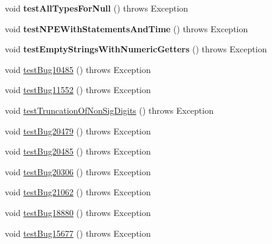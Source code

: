 \begin{DoxyCompactItemize}
void {\bfseries test\+All\+Types\+For\+Null} ()  throws Exception 
\item 
\mbox{\label{classtestsuite_1_1regression_1_1_result_set_regression_test_a9704114e8c4af7e53ecb784c74630535}} 
void {\bfseries test\+N\+P\+E\+With\+Statements\+And\+Time} ()  throws Exception 
\item 
\mbox{\label{classtestsuite_1_1regression_1_1_result_set_regression_test_aa09d2e6b4a7cfb44ec027cacfd75c65e}} 
void {\bfseries test\+Empty\+Strings\+With\+Numeric\+Getters} ()  throws Exception 
\item 
void \mbox{\hyperlink{classtestsuite_1_1regression_1_1_result_set_regression_test_a636970914398d594bf3bb15b35d2388e}{test\+Bug10485}} ()  throws Exception 
\item 
void \mbox{\hyperlink{classtestsuite_1_1regression_1_1_result_set_regression_test_a51f2936ac4b4712e95e6a70490704482}{test\+Bug11552}} ()  throws Exception 
\item 
void \mbox{\hyperlink{classtestsuite_1_1regression_1_1_result_set_regression_test_ab795cff973063bdb983542cffb1c54cd}{test\+Truncation\+Of\+Non\+Sig\+Digits}} ()  throws Exception 
\item 
void \mbox{\hyperlink{classtestsuite_1_1regression_1_1_result_set_regression_test_ac51afa90e507daec20c3fe37a132b0de}{test\+Bug20479}} ()  throws Exception 
\item 
void \mbox{\hyperlink{classtestsuite_1_1regression_1_1_result_set_regression_test_a5e674e0b217a2731be3be70fa79f0007}{test\+Bug20485}} ()  throws Exception 
\item 
void \mbox{\hyperlink{classtestsuite_1_1regression_1_1_result_set_regression_test_a676f6934dd6986c57deb1da3920d7240}{test\+Bug20306}} ()  throws Exception 
\item 
void \mbox{\hyperlink{classtestsuite_1_1regression_1_1_result_set_regression_test_a18bcdff4c2c8f2245a2e5bb6696e2506}{test\+Bug21062}} ()  throws Exception 
\item 
void \mbox{\hyperlink{classtestsuite_1_1regression_1_1_result_set_regression_test_a12e0f87612792e99392825bcd4cb8711}{test\+Bug18880}} ()  throws Exception 
\item 
void \mbox{\hyperlink{classtestsuite_1_1regression_1_1_result_set_regression_test_af586d3a65d3b053faa5dd5da4cd5cb15}{test\+Bug15677}} ()  throws Exception 

\end{DoxyCompactItemize}
